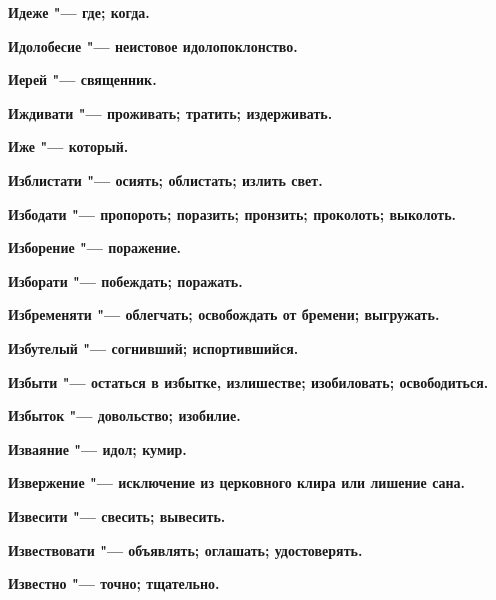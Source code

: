 \bfseries Идеже \normalfont{} "--- где; когда. 




\bfseries Идолобесие \normalfont{} "--- неистовое идолопоклонство. 




\bfseries Иерей \normalfont{} "--- священник. 




\bfseries Иждивати \normalfont{} "--- проживать; тратить; издерживать. 




\bfseries Иже \normalfont{} "--- который. 




\bfseries Изблистати \normalfont{} "--- осиять; облистать; излить свет. 




\bfseries Избодати \normalfont{} "--- пропороть; поразить; пронзить; проколоть; выколоть. 




\bfseries Изборение \normalfont{} "--- поражение. 




\bfseries Изборати \normalfont{} "--- побеждать; поражать. 




\bfseries Избременяти \normalfont{} "--- облегчать; освобождать от бремени; выгружать. 




\bfseries Избутелый \normalfont{} "--- согнивший; испортившийся. 




\bfseries Избыти \normalfont{} "--- остаться в избытке, излишестве; изобиловать; освободиться. 




\bfseries Избыток \normalfont{} "--- довольство; изобилие. 




\bfseries Изваяние \normalfont{} "--- идол; кумир. 




\bfseries Извержение \normalfont{} "--- исключение из церковного клира или лишение сана. 




\bfseries Извесити \normalfont{} "--- свесить; вывесить. 




\bfseries Извествовати \normalfont{} "--- объявлять; оглашать; удостоверять. 




\bfseries Известно \normalfont{} "--- точно; тщательно. 




